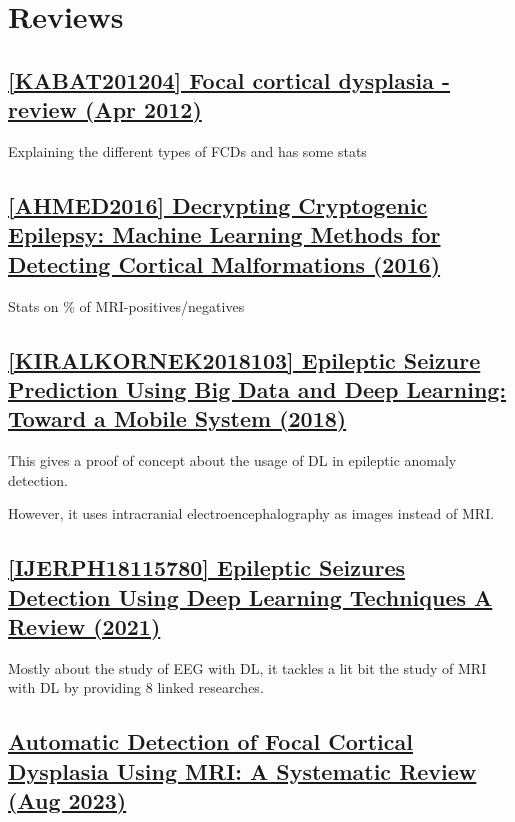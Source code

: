 \chapter{Reviews}

\section{\href{https://pmc.ncbi.nlm.nih.gov/articles/PMC3403799/}{[KABAT201204] Focal cortical dysplasia - review (Apr 2012)}}

Explaining the different types of FCDs and has some stats

\section{\href{Decrypting Cryptogenic Epilepsy: Machine Learning Methods for Detecting Cortical Malformations}{[AHMED2016] Decrypting Cryptogenic Epilepsy: Machine Learning Methods for Detecting Cortical Malformations (2016)}}

Stats on \% of MRI-positives/negatives

\section{\href{https://www.thelancet.com/article/S2352-3964(17)30470-X/fulltext}{[KIRALKORNEK2018103] Epileptic Seizure Prediction Using Big Data and Deep Learning: Toward a Mobile System (2018) }}

This gives a proof of concept about the usage of DL in epileptic anomaly detection.

However, it uses intracranial electroencephalography as images instead of MRI.

\section{\href{https://www.mdpi.com/1660-4601/18/11/5780\#B141-ijerph-18-05780}{[IJERPH18115780] Epileptic Seizures Detection Using Deep Learning Techniques A Review (2021) }}

Mostly about the study of EEG with DL, it tackles a lit bit the study of MRI with DL by providing 8 linked researches.

\section{\href{https://www.mdpi.com/1424-8220/23/16/7072}{Automatic Detection of Focal Cortical Dysplasia Using MRI: A Systematic Review (Aug 2023)}}

